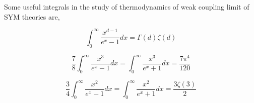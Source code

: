 Some useful integrals in the study of thermodynamics of weak coupling limit of SYM theories are, 

\begin{equation}
    \int_{0}^{\infty} \frac{x^{d-1}}{e^{x} -1} dx = \Gamma(d)\zeta(d) 
\end{equation}

\begin{equation}
    \frac{7}{8}\int_{0}^{\infty} \frac{x^3}{e^{x} -1} dx = 
    \int_{0}^{\infty} \frac{x^3}{e^{x}+1} dx = \frac{7\pi^4}{120} 
\end{equation}

\begin{equation}
    \frac{3}{4}\int_{0}^{\infty} \frac{x^2}{e^{x} -1} dx = 
    \int_{0}^{\infty} \frac{x^2}{e^{x}+1} dx = \frac{3 \zeta(3)}{2}
\end{equation}

